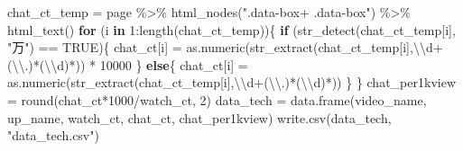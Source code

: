 \documentclass[
]{article}
\newenvironment{Shaded}{\begin{snugshade}}{\end{snugshade}}
\newcommand{\ConstantTok}[1]{\textcolor[rgb]{0.00,0.00,0.00}{#1}}
\newcommand{\ControlFlowTok}[1]{\textcolor[rgb]{0.13,0.29,0.53}{\textbf{#1}}}
\newcommand{\DecValTok}[1]{\textcolor[rgb]{0.00,0.00,0.81}{#1}}
\newcommand{\FunctionTok}[1]{\textcolor[rgb]{0.00,0.00,0.00}{#1}}
\newcommand{\NormalTok}[1]{#1}
\newcommand{\OtherTok}[1]{\textcolor[rgb]{0.56,0.35,0.01}{#1}}
\newcommand{\SpecialCharTok}[1]{\textcolor[rgb]{0.00,0.00,0.00}{#1}}
\newcommand{\StringTok}[1]{\textcolor[rgb]{0.31,0.60,0.02}{#1}}
\begin{document}
\begin{Shaded}
\begin{Highlighting}[]
\NormalTok{chat\_ct\_temp }\OtherTok{=}\NormalTok{ page }\SpecialCharTok{\%\textgreater{}\%} \FunctionTok{html\_nodes}\NormalTok{(}\StringTok{".data{-}box+ .data{-}box"}\NormalTok{) }\SpecialCharTok{\%\textgreater{}\%} \FunctionTok{html\_text}\NormalTok{()}
\ControlFlowTok{for}\NormalTok{ (i }\ControlFlowTok{in} \DecValTok{1}\SpecialCharTok{:}\FunctionTok{length}\NormalTok{(chat\_ct\_temp))\{}
  \ControlFlowTok{if}\NormalTok{ (}\FunctionTok{str\_detect}\NormalTok{(chat\_ct\_temp[i], }\StringTok{"万"}\NormalTok{) }\SpecialCharTok{==} \ConstantTok{TRUE}\NormalTok{)\{}
\NormalTok{    chat\_ct[i] }\OtherTok{=} \FunctionTok{as.numeric}\NormalTok{(}\FunctionTok{str\_extract}\NormalTok{(chat\_ct\_temp[i],}\StringTok{\textquotesingle{}}\SpecialCharTok{\textbackslash{}\textbackslash{}}\StringTok{d+(}\SpecialCharTok{\textbackslash{}\textbackslash{}}\StringTok{.)*(}\SpecialCharTok{\textbackslash{}\textbackslash{}}\StringTok{d)*\textquotesingle{}}\NormalTok{)) }\SpecialCharTok{*} \DecValTok{10000}
\NormalTok{  \}}
  \ControlFlowTok{else}\NormalTok{\{}
\NormalTok{    chat\_ct[i] }\OtherTok{=} \FunctionTok{as.numeric}\NormalTok{(}\FunctionTok{str\_extract}\NormalTok{(chat\_ct\_temp[i],}\StringTok{\textquotesingle{}}\SpecialCharTok{\textbackslash{}\textbackslash{}}\StringTok{d+(}\SpecialCharTok{\textbackslash{}\textbackslash{}}\StringTok{.)*(}\SpecialCharTok{\textbackslash{}\textbackslash{}}\StringTok{d)*\textquotesingle{}}\NormalTok{))}
\NormalTok{  \}}
\NormalTok{\}}
\NormalTok{chat\_per1kview }\OtherTok{=} \FunctionTok{round}\NormalTok{(chat\_ct}\SpecialCharTok{*}\DecValTok{1000}\SpecialCharTok{/}\NormalTok{watch\_ct, }\DecValTok{2}\NormalTok{)}
\NormalTok{data\_tech }\OtherTok{=} \FunctionTok{data.frame}\NormalTok{(video\_name, up\_name, watch\_ct, chat\_ct, chat\_per1kview)}
\FunctionTok{write.csv}\NormalTok{(data\_tech, }\StringTok{"data\_tech.csv"}\NormalTok{)}
\end{Highlighting}
\end{Shaded}
\end{document}
